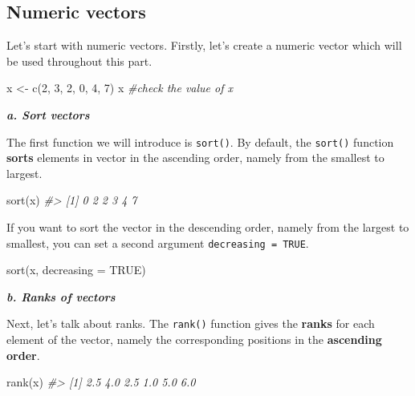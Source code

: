 \documentclass[
]{book}
\newenvironment{Shaded}{\begin{snugshade}}{\end{snugshade}}
\newcommand{\AttributeTok}[1]{\textcolor[rgb]{0.77,0.63,0.00}{#1}}
\newcommand{\CommentTok}[1]{\textcolor[rgb]{0.56,0.35,0.01}{\textit{#1}}}
\newcommand{\ConstantTok}[1]{\textcolor[rgb]{0.00,0.00,0.00}{#1}}
\newcommand{\DecValTok}[1]{\textcolor[rgb]{0.00,0.00,0.81}{#1}}
\newcommand{\FunctionTok}[1]{\textcolor[rgb]{0.00,0.00,0.00}{#1}}
\newcommand{\NormalTok}[1]{#1}
\newcommand{\OtherTok}[1]{\textcolor[rgb]{0.56,0.35,0.01}{#1}}
\begin{document}
\hypertarget{numeric-vectors}{%
\subsection{Numeric vectors}\label{numeric-vectors}}

Let's start with numeric vectors. Firstly, let's create a numeric vector which will be used throughout this part.

\begin{Shaded}
\begin{Highlighting}[]
\NormalTok{x }\OtherTok{\textless{}{-}} \FunctionTok{c}\NormalTok{(}\DecValTok{2}\NormalTok{, }\DecValTok{3}\NormalTok{, }\DecValTok{2}\NormalTok{, }\DecValTok{0}\NormalTok{, }\DecValTok{4}\NormalTok{, }\DecValTok{7}\NormalTok{) }
\NormalTok{x }\CommentTok{\#check the value of x}
\end{Highlighting}
\end{Shaded}

\textbf{\emph{a. Sort vectors}}

The first function we will introduce is \texttt{sort()}. By default, the \texttt{sort()} function \textbf{sorts} elements in vector in the ascending order, namely from the smallest to largest.

\begin{Shaded}
\begin{Highlighting}[]
\FunctionTok{sort}\NormalTok{(x)}
\CommentTok{\#\textgreater{} [1] 0 2 2 3 4 7}
\end{Highlighting}
\end{Shaded}

If you want to sort the vector in the descending order, namely from the largest to smallest, you can set a second argument \texttt{decreasing\ =\ TRUE}.

\begin{Shaded}
\begin{Highlighting}[]
\FunctionTok{sort}\NormalTok{(x, }\AttributeTok{decreasing =} \ConstantTok{TRUE}\NormalTok{)}
\end{Highlighting}
\end{Shaded}

\textbf{\emph{b. Ranks of vectors}}

Next, let's talk about ranks. The \texttt{rank()} function gives the \textbf{ranks} for each element of the vector, namely the corresponding positions in the \textbf{ascending order}.

\begin{Shaded}
\begin{Highlighting}[]
\FunctionTok{rank}\NormalTok{(x)}
\CommentTok{\#\textgreater{} [1] 2.5 4.0 2.5 1.0 5.0 6.0}
\end{Highlighting}
\end{Shaded}
\end{document}
